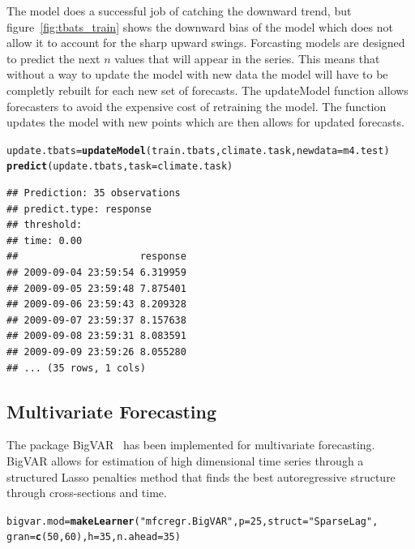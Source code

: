 \documentclass[12pt]{article}\usepackage[]{graphicx}\usepackage[]{color}
\makeatletter
\newcommand{\hlnum}[1]{\textcolor[rgb]{0.686,0.059,0.569}{#1}}%
\newcommand{\hlstr}[1]{\textcolor[rgb]{0.192,0.494,0.8}{#1}}%
\newcommand{\hlstd}[1]{\textcolor[rgb]{0.345,0.345,0.345}{#1}}%
\newcommand{\hlkwb}[1]{\textcolor[rgb]{0.69,0.353,0.396}{#1}}%
\newcommand{\hlkwc}[1]{\textcolor[rgb]{0.333,0.667,0.333}{#1}}%
\newcommand{\hlkwd}[1]{\textcolor[rgb]{0.737,0.353,0.396}{\textbf{#1}}}%
\newenvironment{kframe}{%
 \def\at@end@of@kframe{}%
 \ifinner\ifhmode%
  \def\at@end@of@kframe{\end{minipage}}%
  \begin{minipage}{\columnwidth}%
 \fi\fi%
 \def\FrameCommand##1{\hskip\@totalleftmargin \hskip-\fboxsep
 \colorbox{shadecolor}{##1}\hskip-\fboxsep
     \hskip-\linewidth \hskip-\@totalleftmargin \hskip\columnwidth}%
 \MakeFramed {\advance\hsize-\width
   \@totalleftmargin\z@ \linewidth\hsize
   \@setminipage}}%
 {\par\unskip\endMakeFramed%
 \at@end@of@kframe}
\newenvironment{knitrout}{}{} %
\theoremstyle{definition}
\newcommand\code{\@codex}
\def\@codex#1{{\normalfont\ttfamily\hyphenchar\font=-1 #1}}
\newcommand{\pkg}[1]{{\fontseries{b}\selectfont #1}}
\makeatother
\begin{document}
\doublespacing

The model does a successful job of catching the downward trend, but figure~\ref{fig:tbats_train} shows the downward bias of the model which does not allow it to account for the sharp upward swings. Forcasting models are designed to predict the next $n$ values that will appear in the series. This means that without a way to update the model with new data the model will have to be completly rebuilt for each new set of forecasts. The \code{updateModel} function allows forecasters to avoid the expensive cost of retraining the model. The function updates the model with new points which are then allows for updated forecasts. 

\singlespacing
\begin{knitrout}
\color{fgcolor}\begin{kframe}
\begin{alltt}
\hlstd{update.tbats} \hlkwb{=} \hlkwd{updateModel}\hlstd{(train.tbats, climate.task,} \hlkwc{newdata} \hlstd{= m4.test)}
\hlkwd{predict}\hlstd{(update.tbats,} \hlkwc{task} \hlstd{= climate.task)}
\end{alltt}
\begin{verbatim}
## Prediction: 35 observations
## predict.type: response
## threshold: 
## time: 0.00
##                     response
## 2009-09-04 23:59:54 6.319959
## 2009-09-05 23:59:48 7.875401
## 2009-09-06 23:59:43 8.209328
## 2009-09-07 23:59:37 8.157638
## 2009-09-08 23:59:31 8.083591
## 2009-09-09 23:59:26 8.055280
## ... (35 rows, 1 cols)
\end{verbatim}
\end{kframe}
\end{knitrout}
\doublespacing

\subsection{Multivariate Forecasting}
\label{seq:buildAndTuneMulti}

The package \pkg{BigVAR}~\cite{bigvarpaper} has been implemented for multivariate forecasting. \pkg{BigVAR} allows for estimation of high dimensional time series through a structured Lasso penalties method that finds the best autoregressive structure through cross-sections and time.

\singlespacing
\begin{knitrout}
\color{fgcolor}\begin{kframe}
\begin{alltt}
\hlstd{bigvar.mod} \hlkwb{=} \hlkwd{makeLearner}\hlstd{(}\hlstr{"mfcregr.BigVAR"}\hlstd{,}\hlkwc{p} \hlstd{=} \hlnum{25}\hlstd{,} \hlkwc{struct} \hlstd{=} \hlstr{"SparseLag"}\hlstd{,}
                         \hlkwc{gran} \hlstd{=} \hlkwd{c}\hlstd{(}\hlnum{50}\hlstd{,} \hlnum{60}\hlstd{),}\hlkwc{h} \hlstd{=} \hlnum{35}\hlstd{,} \hlkwc{n.ahead} \hlstd{=} \hlnum{35}\hlstd{)}
\end{alltt}
\end{kframe}
\end{knitrout}
\end{document}

